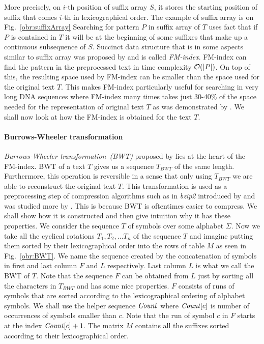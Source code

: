 More precisely, on $i$-th position of suffix array $S$, it stores the starting position of
suffix that comes $i$-th in lexicographical order. The example of suffix array is on
Fig.~\ref{obr:suffixArray} Searching for pattern $P$ in suffix
array of $T$ uses fact that if $P$ is contained in $T$ it will be at the beginning of some
suffixes that make up a continuous subsequence of $S$. Succinct data structure that is in
some aspects similar to suffix array was proposed by \cite{ferragina2000opportunistic} and
is called \textit{FM-index}. FM-index can find the pattern in the preprocessed text in time
complexity $\mathcal{O}(|P|)$. On top of this, the resulting space used by FM-index can be
smaller than the space used for the original text $T$. This makes FM-index particularly useful
for searching in very long DNA sequences where FM-index many times takes just 30-40\% of the
space needed for the representation of original text $T$ as was demonstrated by
\cite{ferragina2001experimental}. We shall now look at how the FM-index is obtained for the text
$T$.

\paragraph{Burrows-Wheeler transformation}

\textit{Burrows-Wheeler transformation~(BWT)} proposed by \cite{burrows1994block} lies at the
heart of the FM-index. BWT of a text $T$ gives us a sequence $\mathit{T_{BWT}}$ of the same
length. Furthermore, this operation is reversible in a sense that only using $\mathit{T_{BWT}}$
we are able to reconstruct the original text $T$. This transformation is used as a
preprocessing step of compression algorithms such as in \textit{bzip2} introduced by
\cite{seward1996bzip2} and was studied more by \cite{manzini2001analysis}. This is because
BWT is oftentimes easier to compress. We shall show how it is constructed and then give 
intuition why it has these properties. We consider the sequence $T$ of symbols over some
alphabet $\Sigma$. Now we take all the cyclical rotations $T_1, T_2, \ldots T_n$ of
the sequence $T$ and imagine putting them sorted by their lexicographical order into the
rows of table $M$ as seen in Fig.~\ref{obr:BWT}. We name the sequence created by the
concatenation of symbols in first and last column $F$ and $L$ respectively. Last column $L$
is what we call the BWT of $T$. Note that the sequence $F$ can be obtained from $L$ just by
sorting all the characters in $\mathit{T_{BWT}}$ and has some nice properties. $F$ consists of
runs of symbols that are sorted according to the lexicographical ordering of alphabet symbols.
We shall use the helper sequence $\mathit{Count}$ where $\mathit{Count}[c]$ is number of
occurrences of symbols smaller than $c$. Note that the run of symbol $c$ in $F$ starts at
the index $\mathit{Count}[c]+1$. The matrix $M$ contains all the suffixes sorted according to their
lexicographical order.

